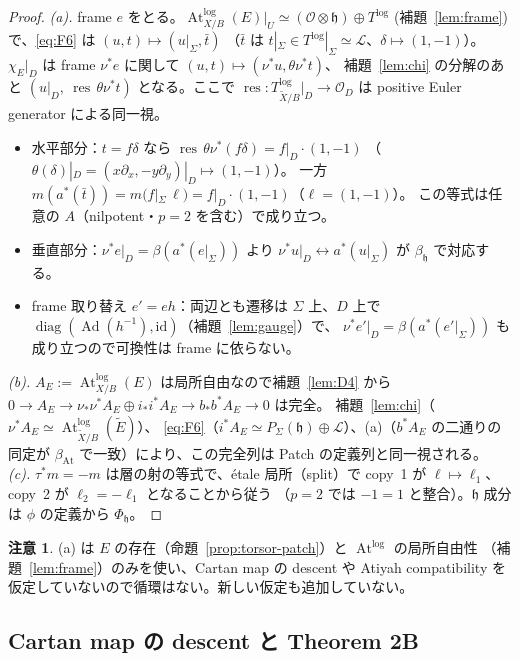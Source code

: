 \documentclass[11pt,a4paper]{article}
\numberwithin{equation}{section}
\theoremstyle{definition}
\newtheorem{remark}[definition]{注意}
\DeclareMathOperator{\At}{At}
\DeclareMathOperator{\Ad}{Ad}
\DeclareMathOperator{\res}{res}
\newcommand{\OO}{\mathcal O}
\newcommand{\h}{\mathfrak h}
\newcommand{\Atlog}{\operatorname{At}^{\log}}
\newcommand{\tX}{\widetilde X}
\newcommand{\tE}{\widetilde E}
\newcommand{\LL}{\mathcal L}
\begin{document}
\begin{proof}
\emph{(a).} frame $e$ をとる。$\Atlog_{X/B}(E)|_U\simeq(\OO\otimes\h)\oplus T^{\log}$
(補題~\ref{lem:frame}) で、\eqref{eq:F6} は $(u,t)\mapsto(u|_\Sigma,\bar t)$
（$\bar t$ は $t|_\Sigma\in T^{\log}|_\Sigma\simeq\LL$、$\delta\mapsto(1,-1)$）。
$\chi_E|_D$ は frame $\nu^*e$ に関して $(u,t)\mapsto(\nu^*u,\theta\nu^*t)$、
補題~\ref{lem:chi} の分解のあと $(u|_D,\ \res\,\theta\nu^*t)$ となる。ここで
$\res:T^{\log}_{\tX/B}|_D\to\OO_D$ は positive Euler generator による同一視。
\begin{itemize}
\item 水平部分：$t=f\delta$ なら $\res\,\theta\nu^*(f\delta)=f|_D\cdot(1,-1)$
  （$\theta(\delta)|_D=(x\partial_x,-y\partial_y)|_D\mapsto(1,-1)$）。
  一方 $m(a^*(\bar t))=m(f|_\Sigma\,\ell)=f|_D\cdot(1,-1)$（$\ell=(1,-1)$）。
  この等式は任意の $A$（nilpotent・$p=2$ を含む）で成り立つ。
\item 垂直部分：$\nu^*e|_D=\beta(a^*(e|_\Sigma))$ より $\nu^*u|_D\leftrightarrow
  a^*(u|_\Sigma)$ が $\beta_\h$ で対応する。
\item frame 取り替え $e'=eh$：両辺とも遷移は $\Sigma$ 上、$D$ 上で
  $\operatorname{diag}(\Ad(h^{-1}),\mathrm{id})$（補題~\ref{lem:gauge}）で、
  $\nu^*e'|_D=\beta(a^*(e'|_\Sigma))$ も成り立つので可換性は frame に依らない。
\end{itemize}
\emph{(b).} $A_E:=\Atlog_{X/B}(E)$ は局所自由なので補題~\ref{lem:D4} から
$0\to A_E\to\nu_*\nu^*A_E\oplus i_*i^*A_E\to b_*b^*A_E\to0$ は完全。
補題~\ref{lem:chi}（$\nu^*A_E\simeq\Atlog_{\tX/B}(\tE)$）、
\eqref{eq:F6}（$i^*A_E\simeq P_\Sigma(\h)\oplus\LL$）、(a)（$b^*A_E$ の二通りの
同定が $\beta_{\At}$ で一致）により、この完全列は Patch の定義列と同一視される。
\emph{(c).} $\tau^*m=-m$ は層の射の等式で、étale 局所（split）で
copy~1 が $\ell\mapsto\ell_1$、copy~2 が $\ell_2=-\ell_1$ となることから従う
（$p=2$ では $-1=1$ と整合）。$\h$ 成分は $\phi$ の定義から $\Phi_\h$。
\end{proof}

\begin{remark}
(a) は $E$ の存在（命題~\ref{prop:torsor-patch}）と $\Atlog$ の局所自由性
（補題~\ref{lem:frame}）のみを使い、Cartan map の descent や
Atiyah compatibility を仮定していないので循環はない。新しい仮定も追加していない。
\end{remark}

\subsection{Cartan map の descent と Theorem 2B}
\end{document}
